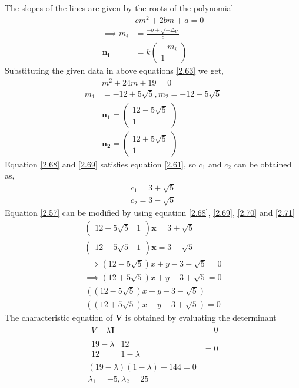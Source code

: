 \documentclass[journal,12pt,twocolumn]{IEEEtran}
\let\vec\mathbf
\numberwithin{equation}{subsection}
\newcommand{\myvec}[1]{\ensuremath{\begin{pmatrix}#1\end{pmatrix}}}
\providecommand{\brak}[1]{\ensuremath{\left(#1\right)}}
\begin{document}
The slopes of the lines are given by the roots of the polynomial 
\begin{align}
    &cm^2+2bm+a=0\label{2.63}\\
    \implies m_i&=\frac{-b\pm{\sqrt{-\Delta_{V}}}}{c}\\
    \vec{n_i}&=k\myvec{-m_i\\1}
\end{align}
Substituting the given data in above equations \ref{2.63} we get,
\begin{align}
    &m^2+24m+19=0\\
    m_1&=-12 + 5\sqrt{5},  m_2=-12 - 5\sqrt{5}\\
   & \vec{n_1}=\myvec{12-5\sqrt{5}\\ 1} \label{2.68}\\
& \vec{n_2}=\myvec{12+5\sqrt{5}\\ 1} \label{2.69}
\end{align}
 Equation \ref{2.68} and \ref{2.69} satisfies equation \ref{2.61}, so $c_1$ and $c_2$ can be obtained as,
\begin{align}
c_1 = 3 + \sqrt{5}  \label{2.70}\\
c_2 = 3 - \sqrt{5} \label{2.71}
\end{align}
Equation \ref{2.57} can be modified by using equation \ref{2.68},  \ref{2.69},  \ref{2.70} and \ref{2.71}
\begin{align}
\myvec{12-5\sqrt{5} & 1}\vec{x} = 3+ \sqrt{5}\\
\myvec{12+5\sqrt{5} & 1}\vec{x} = 3- \sqrt{5}\\
\implies(12-5\sqrt{5})x + y -3-\sqrt{5} = 0\\
\implies(12+5\sqrt{5})x + y -3+\sqrt{5} = 0
\end{align}
\begin{multline}
((12-5\sqrt{5})x + y -3-\sqrt{5})\\((12+5\sqrt{5})x + y -3+\sqrt{5}) = 0
\end{multline}
The characteristic equation of $\vec{V}$ is obtained by evaluating the determinant 
\begin{align}
       \begin{array}{|c|}
V-\lambda\vec{I}
\end{array}&=0\\
   \begin{array}{|cc|}
19-\lambda & 12 \\ 12 & 1-\lambda
\end{array}&=0\\
    \brak{19-\lambda}\brak{1-\lambda}-144=0\\
    \lambda_{1}=-5,   \lambda_{2}= 25 \label{2.80}
\end{align}
\end{document}
